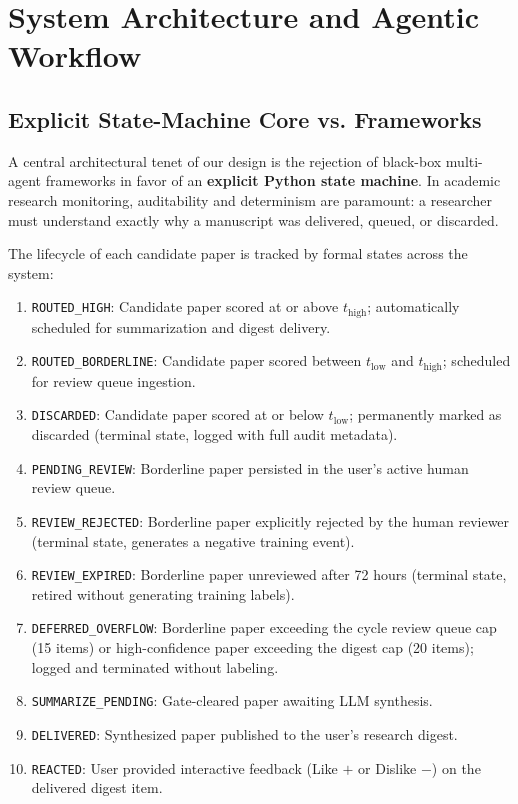 \section{System Architecture and Agentic Workflow}
\label{sec:architecture}

\subsection{Explicit State-Machine Core vs. Frameworks}
\label{sec:statemachine}

A central architectural tenet of our design is the rejection of black-box multi-agent frameworks in favor of an \textbf{explicit Python state machine}. In academic research monitoring, auditability and determinism are paramount: a researcher must understand exactly why a manuscript was delivered, queued, or discarded.

The lifecycle of each candidate paper is tracked by formal states across the system:
\begin{enumerate}
    \item \texttt{ROUTED\_HIGH}: Candidate paper scored at or above $t_{\text{high}}$; automatically scheduled for summarization and digest delivery.
    \item \texttt{ROUTED\_BORDERLINE}: Candidate paper scored between $t_{\text{low}}$ and $t_{\text{high}}$; scheduled for review queue ingestion.
    \item \texttt{DISCARDED}: Candidate paper scored at or below $t_{\text{low}}$; permanently marked as discarded (terminal state, logged with full audit metadata).
    \item \texttt{PENDING\_REVIEW}: Borderline paper persisted in the user's active human review queue.
    \item \texttt{REVIEW\_REJECTED}: Borderline paper explicitly rejected by the human reviewer (terminal state, generates a negative training event).
    \item \texttt{REVIEW\_EXPIRED}: Borderline paper unreviewed after 72 hours (terminal state, retired without generating training labels).
    \item \texttt{DEFERRED\_OVERFLOW}: Borderline paper exceeding the cycle review queue cap (15 items) or high-confidence paper exceeding the digest cap (20 items); logged and terminated without labeling.
    \item \texttt{SUMMARIZE\_PENDING}: Gate-cleared paper awaiting LLM synthesis.
    \item \texttt{DELIVERED}: Synthesized paper published to the user's research digest.
    \item \texttt{REACTED}: User provided interactive feedback (Like $\pmb{+}$ or Dislike $\pmb{-}$) on the delivered digest item.
\end{enumerate}

